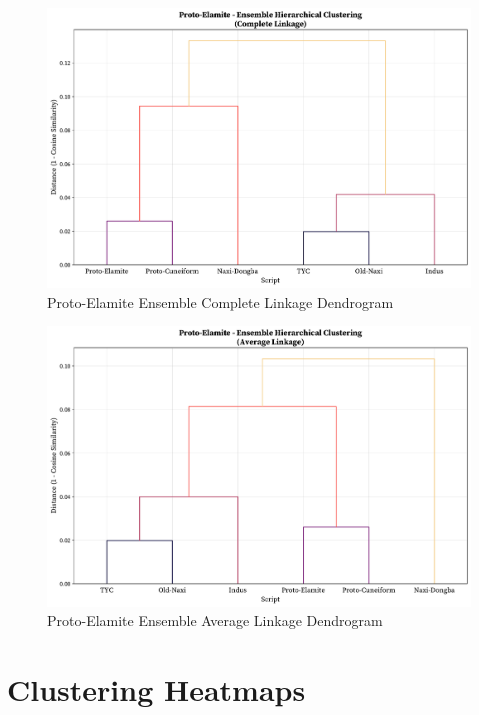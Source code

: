 \documentclass[11pt,a4paper,oneside]{report}
\begin{document}
\begin{figure}[H] 
    \centering
    \includegraphics[width=1\linewidth]{Visualizations/Dendrograms/Proto-Elamite/ensemble_dendrogram_complete.pdf}
     \caption*{Proto-Elamite Ensemble Complete Linkage Dendrogram}
\end{figure}

\begin{figure}[H] 
    \centering
    \includegraphics[width=1\linewidth]{Visualizations/Dendrograms/Proto-Elamite/ensemble_dendrogram_average.pdf}
     \caption*{Proto-Elamite Ensemble Average Linkage Dendrogram}
\end{figure}

\section{Clustering Heatmaps}
\label{app: heatmaps}
\end{document}
